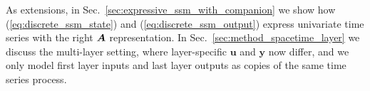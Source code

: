 %
As extensions, in Sec.~\ref{sec:expressive_ssm_with_companion} we show how (\ref{eq:discrete_ssm_state}) and (\ref{eq:discrete_ssm_output}) express univariate time series with the right $\boldsymbol{A}$ representation.
%
In Sec.~\ref{sec:method_spacetime_layer} we discuss the multi-layer setting, where layer-specific $\boldsymbol{u}$ and $\boldsymbol{y}$ now differ, and we only model first layer inputs and last layer outputs as copies of the same time series process.











